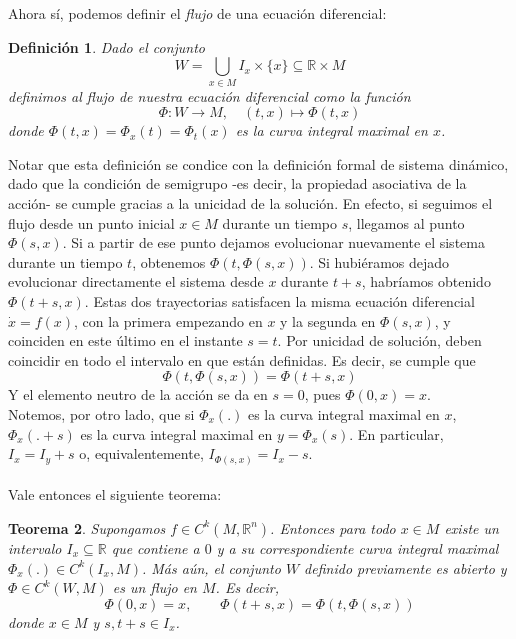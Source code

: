 \documentclass[12pt,a4paper]{article}
\newtheorem{theorem}{Teorema}[section]
\newtheorem{definition}[theorem]{Definición}
\begin{document}
\\
\\
Ahora sí, podemos definir el \textit{flujo} de una ecuación diferencial:
\begin{definition}
    Dado el conjunto
    \[
    \displaystyle W = \bigcup_{x \in M} I_x \times \{x\} \subseteq \mathbb{R} \times M
    \]
    definimos al flujo de nuestra ecuación diferencial como la función
    \[
    \Phi: W \rightarrow M, \quad (t, x) \mapsto \Phi(t,x)
    \]
    donde $\Phi(t,x) = \Phi_x(t) = \Phi_t(x)$ es la curva integral maximal en $x$.
\end{definition}
Notar que esta definición se condice con la definición formal de sistema dinámico, dado que la condición de semigrupo -es decir, la propiedad asociativa de la acción- se cumple gracias a la unicidad de la solución. En efecto, si seguimos el flujo desde un punto inicial $x \in M$ durante un tiempo $s$, llegamos al punto $\Phi(s, x)$. Si a partir de ese punto dejamos evolucionar nuevamente el sistema durante un tiempo $t$, obtenemos $\Phi(t, \Phi(s, x))$. Si hubiéramos dejado evolucionar directamente el sistema desde $x$ durante $t + s$, habríamos obtenido $\Phi(t+s, x)$. Estas dos trayectorias satisfacen la misma ecuación diferencial $\dot{x} = f(x)$, con la primera empezando en $x$ y la segunda en $\Phi(s,x)$, y coinciden en este último en el instante $s = t$. Por unicidad de solución, deben coincidir en todo el intervalo en que están definidas. Es decir, se cumple que
\[
\Phi(t, \Phi(s, x)) = \Phi(t+s, x)
\]
Y el elemento neutro de la acción se da en $s = 0$, pues $\Phi(0, x) = x$.
\\

Notemos, por otro lado, que si $\Phi_x(.)$ es la curva integral maximal en $x$, $\Phi_x(.+s)$ es la curva integral maximal en $y = \Phi_x(s)$. En particular, $I_x = I_y + s$ o, equivalentemente, $I_{\Phi(s,x)} = I_x - s$.
\\
\\
Vale entonces el siguiente teorema:
\begin{theorem}    
Supongamos $f \in C^k(M, \mathbb{R}^n)$. Entonces para todo $x \in M$ existe un intervalo $I_x \subseteq \mathbb{R}$ que contiene a $0$ y a su correspondiente curva integral maximal $\Phi_x(.) \in C^k(I_x, M)$. Más aún, el conjunto $W$ definido previamente es abierto y $\Phi \in C^k(W, M)$ es un flujo en $M$. Es decir,
\[
\Phi(0,x) = x, \qquad \Phi(t+s,x) = \Phi(t, \Phi(s,x))
\]
donde $x \in M$ y $s, t+s \in I_x$.
\end{theorem}
\medskip
\end{document}
